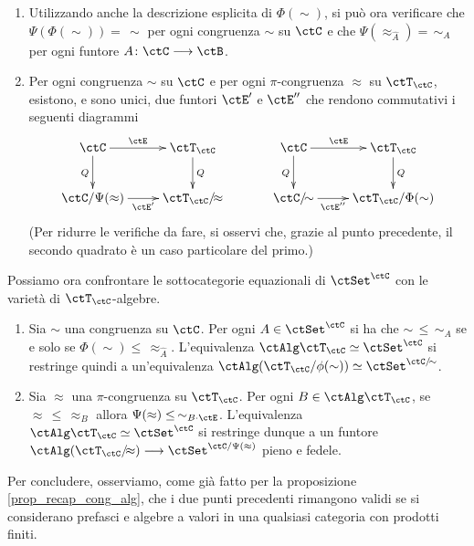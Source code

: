 \begin{exercise}
\begin{enumerate}
        contenute nella dimostrazione della proposizione \ref{prop_compl_finprod}.)
  \item Utilizzando anche la descrizione esplicita di \(\Phi(\sim)\), si può ora verificare che \(\Psi(\Phi(\sim)) =\, \sim\)
        per ogni congruenza \(\sim\) su \(\ctC\) e che \(\Psi(\approx_{\widehat{A}}) =\, \sim_A\) per ogni funtore \(A \colon \ctC \fun \ctB\).
  \item Per ogni congruenza \(\sim\) su \(\ctC\) e per ogni \(\pi\)-congruenza \(\approx\) su \(\ctT_\ctC\), esistono, e sono unici,
        due funtori \(\ctE'\) e \(\ctE''\) che rendono commutativi i seguenti diagrammi
        \[ \xymatrix{\ctC \ar[r]^-{\ctE} \ar[d]_{Q} & \ctT_\ctC \ar[d]^{Q} \\ \ctC/\Psi(\approx) \ar[r]_-{\ctE'} & \ctT_\ctC/{\!\approx} }
         \;\;\;\;\;\;\;\;\;\;\;\;
         \xymatrix{\ctC \ar[r]^-{\ctE} \ar[d]_{Q} & \ctT_\ctC \ar[d]^{Q} \\ \ctC/{\!\sim} \ar[r]_-{\ctE''} & \ctT_\ctC/\Phi(\sim)} \]
        (Per ridurre le verifiche da fare, si osservi che, grazie al punto precedente, il secondo quadrato è un caso particolare del primo.)
 \end{enumerate}
 Possiamo ora confrontare le sottocategorie equazionali di \(\ctSet^\ctC\) con le varietà di \(\ctT_\ctC\)-algebre.
 \begin{enumerate}
  \item[5.] Sia \(\sim\) una congruenza su \(\ctC\). Per ogni \(A \in \ctSet^\ctC\) si ha che
        \(\sim \,\leq\, \sim_A\) se e solo se \(\Phi(\sim) \leq\, \approx_{\widehat{A}}\).
        L'equivalenza \(\ctAlg\ctT_\ctC \simeq \ctSet^\ctC\) si restringe quindi a un'equivalenza
        \(\ctAlg(\ctT_\ctC/\phi(\sim)) \simeq \ctSet^{\ctC/{\!\sim}}\).
  \item[6.] Sia \(\approx\) una \(\pi\)-congruenza su \(\ctT_\ctC\). Per ogni \(B \in \ctAlg\ctT_\ctC\), se \(\approx \,\leq\, \approx_B\) allora
        \(\Psi(\approx) \leq\, \sim_{B \cmp \ctE}\).
        L'equivalenza \(\ctAlg\ctT_\ctC \simeq \ctSet^\ctC\) si restringe dunque a un funtore
        \(\ctAlg(\ctT_\ctC/{\!\approx}) \fun \ctSet^{\ctC/\Psi(\approx)}\) pieno e fedele.
 \end{enumerate}
 Per concludere, osserviamo, come già fatto per la proposizione \ref{prop_recap_cong_alg}, che i due punti precedenti
 rimangono validi se si considerano prefasci e algebre a valori in una qualsiasi categoria con prodotti finiti.
\end{exercise}

